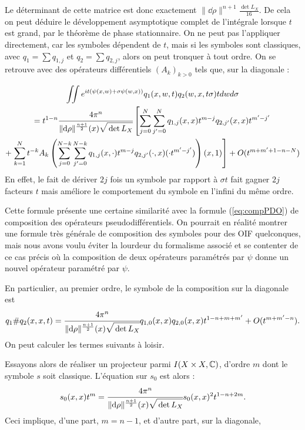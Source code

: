 Le déterminant de cette matrice est donc exactement $\|\dd\rho\|^{n+1}\frac{\det L_X}{16}$. De cela on peut déduire le développement asymptotique complet de l'intégrale lorsque $t$ est grand, par le théorème de phase stationnaire. On ne peut pas l'appliquer directement, car les symboles dépendent de $t$, mais si les symboles sont classiques, avec $q_1 = \sum q_{1,j}$ et $q_2 = \sum q_{2,j}$, alors on peut tronquer à tout ordre. On se retrouve avec des opérateurs différentiels $(A_k)_{k >0}$ tels que, sur la diagonale :

\begin{multline*}
  \iint e^{it(\psi(x,w)+\sigma \psi(w,x))}q_1(x,w,t)q_2(w,x,t\sigma)tdwd\sigma \\= t^{1-n}\cfrac{4\pi^n}{\|\dd\rho\|^{\frac{n+1}{2}}(x)\sqrt{\vphantom{\hat{A}}\det L_X}}\left[\sum_{j=0}^{N}\sum_{j'=0}^{N} q_{1,j}(x,x)t^{m-j}q_{2,j'}(x,x)t^{m'-j'}\right. \\+ \left.\sum_{k=1}^{N}t^{-k}A_k\left(\sum_{j=0}^{N-k}\sum_{j'=0}^{N-k} q_{1,j}(x,\cdot)t^{m-j}q_{2,j'}(\cdot,x)(\cdot t^{m'-j'})\right)(x,1)\right] + O(t^{m+m'+1-n-N})
\end{multline*}
En effet, le fait de dériver $2j$ fois un symbole par rapport à $\sigma t$ fait gagner $2j$ facteurs $t$ mais améliore le comportement du symbole en l'infini du même ordre.

\begin{rem}
Cette formule présente une certaine similarité avec la formule (\ref{eq:compPDO}) de composition des opérateurs pseudodifférentiels. On pourrait en réalité montrer une formule très générale de composition des symboles pour des OIF quelconques, mais nous avons voulu éviter la lourdeur du formalisme associé et se contenter de ce cas précis où la composition de deux opérateurs paramétrés par $\psi$ donne un nouvel opérateur paramétré par $\psi$.
\end{rem}

En particulier, au premier ordre, le symbole de la composition sur la diagonale est
\begin{equation*}
  q_1\#q_2(x,x,t) = \cfrac{4\pi^n}{\|\dd\rho\|^{\frac{n+1}{2}}(x)\sqrt{\vphantom{\hat{A}}\det L_X}}q_{1,0}(x,x)q_{2,0}(x,x)t^{1-n+m+m'} + O(t^{m+m'-n}).
\end{equation*}
On peut calculer les termes suivants à loisir.

Essayons alors de réaliser un projecteur parmi $I(X\times X,\mathbb{C})$, d'ordre $m$ dont le symbole $s$ soit classique. L'équation sur $s_0$ est alors :
\begin{equation*}
  s_0(x,x)t^m = \cfrac{4\pi^n}{\|\dd\rho\|^{\frac{n+1}{2}}(x)\sqrt{\vphantom{\hat{A}}\det L_X}}s_0(x,x)^2t^{1-n+2m}.
\end{equation*}
Ceci implique, d'une part, $m=n-1$, et d'autre part, sur la diagonale,

